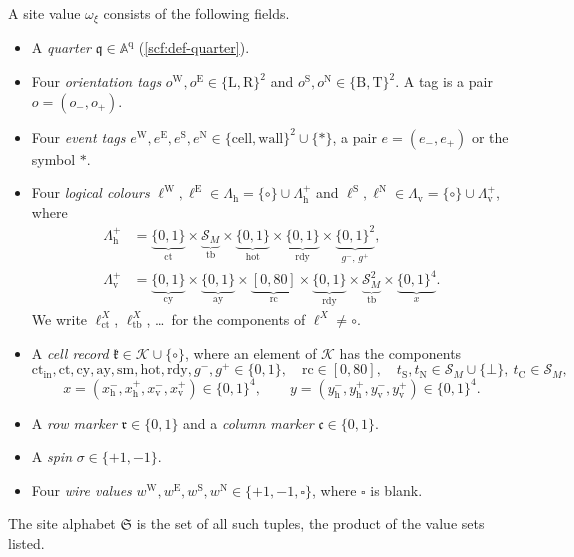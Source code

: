A site value $\omega_\xi$ consists of the following fields.
\begin{itemize}
\item[(F1)] A \emph{quarter} $\mathfrak q\in\mathbb A^{\mathrm q}$ (\cref{scf:def-quarter}).
\item[(F2)] Four \emph{orientation tags} $o^{\mathrm W},o^{\mathrm E}\in\{\mathrm L,\mathrm R\}^2$ and $o^{\mathrm S},o^{\mathrm N}\in\{\mathrm B,\mathrm T\}^2$. A tag is a pair $o=(o_-,o_+)$.
\item[(F3)] Four \emph{event tags} $e^{\mathrm W},e^{\mathrm E},e^{\mathrm S},e^{\mathrm N}\in\{\mathrm{cell},\mathrm{wall}\}^2\cup\{*\}$, a pair $e=(e_-,e_+)$ or the symbol $*$.
\item[(F4)] Four \emph{logical colours} $\ell^{\mathrm W},\ell^{\mathrm E}\in\Lambda_{\mathrm h}=\{\circ\}\cup\Lambda_{\mathrm h}^+$ and $\ell^{\mathrm S},\ell^{\mathrm N}\in\Lambda_{\mathrm v}=\{\circ\}\cup\Lambda_{\mathrm v}^+$, where
\begin{align*}
\Lambda_{\mathrm h}^+&=\underbrace{\{0,1\}}_{\mathrm{ct}}\times\underbrace{\mathcal S_M}_{\mathrm{tb}}\times\underbrace{\{0,1\}}_{\mathrm{hot}}\times\underbrace{\{0,1\}}_{\mathrm{rdy}}\times\underbrace{\{0,1\}^2}_{g^-,\,g^+},\\
\Lambda_{\mathrm v}^+&=\underbrace{\{0,1\}}_{\mathrm{cy}}\times\underbrace{\{0,1\}}_{\mathrm{ay}}\times\underbrace{[0,80]}_{\mathrm{rc}}\times\underbrace{\{0,1\}}_{\mathrm{rdy}}\times\underbrace{\mathcal S_M^2}_{\mathrm{tb}}\times\underbrace{\{0,1\}^4}_{x}.
\end{align*}
We write $\ell^{X}_{\mathrm{ct}}$, $\ell^X_{\mathrm{tb}}$, \dots\ for the components of $\ell^X\ne\circ$.
\item[(F5)] A \emph{cell record} $\mathfrak k\in\mathcal K\cup\{\circ\}$, where an element of $\mathcal K$ has the components
\[
\mathrm{ct}_{\mathrm{in}},\mathrm{ct},\mathrm{cy},\mathrm{ay},\mathrm{sm},\mathrm{hot},\mathrm{rdy},g^-,g^+\in\{0,1\},\quad \mathrm{rc}\in[0,80],\quad t_{\mathrm S},t_{\mathrm N}\in\mathcal S_M\cup\{\bot\},\ t_{\mathrm C}\in\mathcal S_M,
\]
\[
x=(x^-_{\mathrm h},x^+_{\mathrm h},x^-_{\mathrm v},x^+_{\mathrm v})\in\{0,1\}^4,\qquad y=(y^-_{\mathrm h},y^+_{\mathrm h},y^-_{\mathrm v},y^+_{\mathrm v})\in\{0,1\}^4 .
\]
\item[(F6)] A \emph{row marker} $\mathfrak r\in\{0,1\}$ and a \emph{column marker} $\mathfrak c\in\{0,1\}$.
\item[(F7)] A \emph{spin} $\sigma\in\{+1,-1\}$.
\item[(F8)] Four \emph{wire values} $w^{\mathrm W},w^{\mathrm E},w^{\mathrm S},w^{\mathrm N}\in\{+1,-1,\square\}$, where $\square$ is blank.
\end{itemize}
The site alphabet $\mathfrak S$ is the set of all such tuples, the product of the value sets listed.

